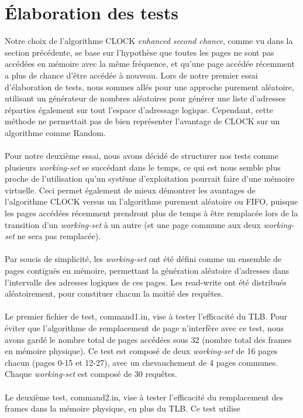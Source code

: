 \documentclass{article}
\begin{document}
\section{Élaboration des tests}
\setlength{\parindent}{20pt}
Notre choix de l’algorithme CLOCK \emph{enhanced second chance}, comme vu dans la section précédente, se base sur l’hypothèse que toutes les pages ne sont pas
 accédées en mémoire avec la même fréquence, et qu’une page accédée récemment a plus de chance d’être accédée à nouveau. 
Lors de notre premier essai d’élaboration de tests, nous sommes allés pour une approche purement aléatoire, utilisant un générateur de nombres
 aléatoires pour générer une liste d’adresses réparties également sur tout l’espace d’adressage logique. Cependant, cette méthode ne permettait 
 pas de bien représenter l’avantage de CLOCK sur un algorithme comme Random.\\
\\
Pour notre deuxième essai, nous avons décidé de structurer nos tests comme plusieurs \emph{working-set} se succédant dans le temps, ce qui est nous 
semble plus proche de l’utilisation qu’un système d’exploitation pourrait faire d’une mémoire virtuelle. Ceci permet également de mieux démontrer 
les avantages de l’algorithme CLOCK versus un l’algorithme purement aléatoire ou FIFO, puisque les pages accédées récemment prendront plus de 
temps à être remplacée lors de la transition d’un \emph{working-set} à un autre (et une page commune aux deux \emph{working-set} ne sera pas remplacée).\\
\\
Par soucis de simplicité, les \emph{working-set} ont été défini comme un ensemble de pages contiguës en mémoire, permettant la génération aléatoire 
d’adresses dans l’intervalle des adresses logiques de ces pages. Les read-write ont été distribués aléatoirement, pour constituer chacun la 
moitié des requêtes.\\    
\\
Le premier fichier de test, command1.in, vise à tester l’efficacité du TLB. Pour éviter que l’algorithme de remplacement de page n’interfère 
avec ce test, nous avons gardé le nombre total de pages accédées sous 32 (nombre total des frames en mémoire physique). Ce test est composé de 
deux \emph{working-set} de 16 pages chacun (pages 0-15 et 12-27), avec un chevauchement de 4 pages communes. Chaque \emph{working-set} est composé de 30 requêtes.\\ 
\\
Le deuxième test, command2.in, vise à tester l’efficacité du remplacement des frames dans la mémoire physique, en plus du TLB. Ce test utilise 
\end{document}
